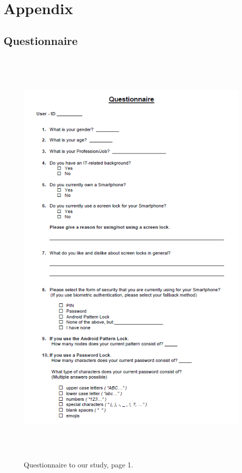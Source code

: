 

\chapter{Appendix}\label{ch:appendix} 

\section{Questionnaire}
\begin{figure}[H]
\includegraphics[width=15cm, height=21cm]{Chapters/graphics/survey1.PNG}
\caption{Questionnaire to our study, page 1.}
\label{fig:survey1}
\end{figure}

